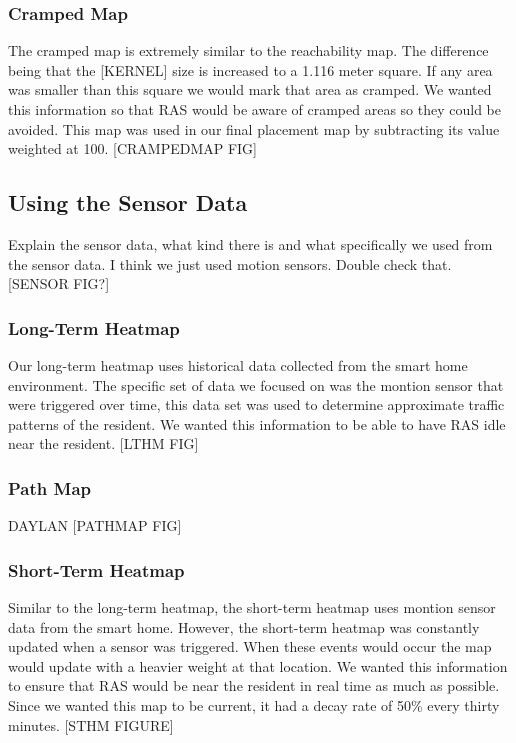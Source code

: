 \documentclass[11pt, draft, a4paper]{IEEEtran}
\begin{document}
\subsubsection{Cramped Map}
The cramped map is extremely similar to the reachability map. The difference being that the [KERNEL] size is increased to a 1.116 meter square. If any area was smaller than this square we would mark that area as cramped. We wanted this information so that RAS would be aware of cramped areas so they could be avoided. This map was used in our final placement map by subtracting its value weighted at 100. [CRAMPEDMAP FIG]


\subsection{Using the Sensor Data}
Explain the sensor data, what kind there is and what specifically we used from the sensor data. I think we just used motion sensors. Double check that. [SENSOR FIG?]


\subsubsection{Long-Term Heatmap}
Our long-term heatmap uses historical data collected from the smart home environment. The specific set of data we focused on was the montion sensor that were triggered over time, this data set was used to determine approximate traffic patterns of the resident. We wanted this information to be able to have RAS idle near the resident. [LTHM FIG]


\subsubsection{Path Map}
DAYLAN
[PATHMAP FIG]


\subsubsection{Short-Term Heatmap}
Similar to the long-term heatmap, the short-term heatmap uses montion sensor data from the smart home. However, the short-term heatmap was constantly updated when a sensor was triggered. When these events would occur the map would update with a heavier weight at that location. We wanted this information to ensure that RAS would be near the resident in real time as much as possible. Since we wanted this map to be current, it had a decay rate of 50\% every thirty minutes. [STHM FIGURE]
\end{document}
